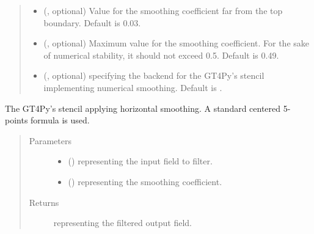 \documentclass[letterpaper,10pt,english]{sphinxmanual}
\begin{document}
\begin{fulllineitems}
\begin{fulllineitems}
\begin{quote}
\begin{description}
\begin{itemize}
\item {} 
 (, optional) \textendash{} Value for the smoothing coefficient far from the top boundary. Default is 0.03.

\item {} 
 (, optional) \textendash{} Maximum value for the smoothing coefficient. For the sake of numerical stability, it should not
exceed 0.5. Default is 0.49.

\item {} 
 (, optional) \textendash{}  specifying the backend for the GT4Py’s stencil implementing numerical
smoothing. Default is .

\end{itemize}

\end{description}\end{quote}

\end{fulllineitems}


\begin{fulllineitems}
\label{\detokenize{api:dycore.horizontal_smoothing.HorizontalSmoothingSecondOrderYZ._stencil_defs}}
The GT4Py’s stencil applying horizontal smoothing. A standard centered 5-points formula is used.
\begin{quote}\begin{description}
\item[{Parameters}] \leavevmode\begin{itemize}
\item {} 
 () \textendash{}  representing the input field to filter.

\item {} 
 () \textendash{}  representing the smoothing coefficient.

\end{itemize}

\item[{Returns}] \leavevmode
{} representing the filtered output field.


\end{description}
\end{quote}
\end{fulllineitems}
\end{fulllineitems}
\end{document}

